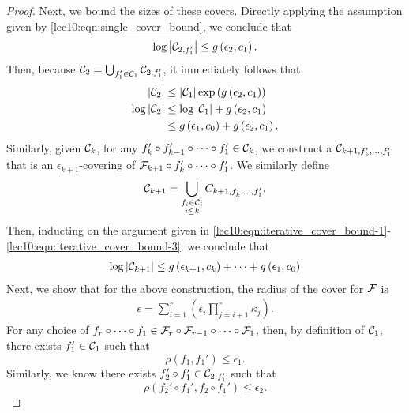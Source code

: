 \begin{proof}
	Next, we bound the sizes of these covers. Directly applying the assumption given by \eqref{lec10:eqn:single_cover_bound}, we conclude that
	\begin{align}
	\log \left\lvert\mathcal C_{2, f_1'}\right\rvert \leq g\left(\epsilon_2, c_1\right).
	\end{align}
	Then, because $\mathcal C_2 = \bigcup_{f_1'\in \mathcal C_1}\mathcal C_{2,f_1'}$, it immediately follows that
	\begin{align}
	\left\lvert\mathcal C_{2}\right\rvert &\leq \left\lvert\mathcal C_{1}\right\rvert \exp\left(g\left(\epsilon_2, c_1\right)\right) \label{lec10:eqn:iterative_cover_bound-1}\\
	\log\left\lvert\mathcal C_{2}\right\rvert &\leq \log\left\lvert\mathcal C_{1}\right\rvert + g\left(\epsilon_2, c_1\right) \\
	&\leq g\left(\epsilon_1, c_0\right) + g\left(\epsilon_2, c_1\right).  \label{lec10:eqn:iterative_cover_bound-3}
	\end{align}
	Similarly, given $\mathcal C_k$, for any $f_k' \circ f_{k-1}' \circ \cdots \circ f_1' \in \mathcal C_k$, we construct a $\mathcal C_{k+1, f_k', \dots, f_1'}$ that is an $\epsilon_{k+1}$-covering of $\mathcal F_{k+1} \circ f_k' \circ \cdots \circ f_1'$. We similarly define 
	\begin{equation}
	\mathcal C_{k+1} = \bigcup_{\substack{f_i \in \mathcal C_i \\ i \leq k}} C_{k+1, f_k', \dots, f_1'}.
	\end{equation}
	Then, inducting on the argument given in \eqref{lec10:eqn:iterative_cover_bound-1}-\eqref{lec10:eqn:iterative_cover_bound-3}, we conclude that
	\begin{align}
	\log \left\lvert\mathcal C_{k+1}\right\rvert \leq g\left(\epsilon_{k+1}, c_k\right) + \cdots + g\left(\epsilon_1, c_0\right)
	\end{align}
	Next, we show that for the above construction, the radius of the cover for $\mathcal F$ is
	\begin{align}
	\epsilon = \sum_{i=1}^{r} \left(\epsilon_i \prod_{j=i+1}^{r}\kappa_{j}\right).
	\end{align}
	For any choice of $f_r \circ \cdots \circ f_1 \in \mathcal F_r \circ \mathcal F_{r-1} \circ \cdots \circ \mathcal F_1$,  then, by definition of $\mathcal C_1$, there exists $f_1' \in \mathcal C_1$ such that 
	\begin{equation}
	\rho(f_1, f_1') \leq \epsilon_1.
	\end{equation} 
	Similarly, we know there exists $f_2' \circ f_1' \in \mathcal C_{2, f_1'}$ such that 
	\begin{equation} 
	\rho\left(f_2' \circ f_1', f_2\circ f_1' \right) \leq \epsilon_2.
	\end{equation}

\end{proof}
